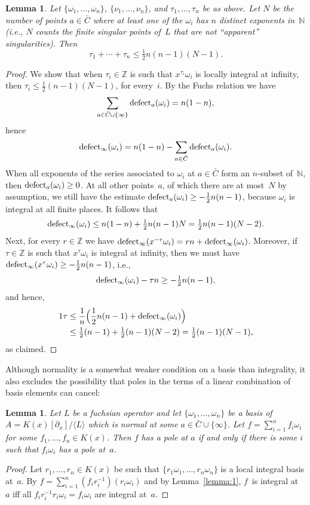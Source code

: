 \documentclass{sig-alternate}
\newtheorem{lemma}[theorem]{Lemma}
\def\<#1>{\langle#1\rangle}
\let\set\mathbb
\begin{document}
\begin{lemma}\label{lemma:bound-exps}
  Let $\{\omega_1,\dots,\omega_n\}$, $\{\nu_1,\dots,\nu_n\}$, and $\tau_1,\dots,\tau_n$ be as above.
  Let $N$ be the number of points $a\in\bar C$ where at least one of the $\omega_i$ has
  $n$ distinct exponents in~$\set N$ (i.e., $N$ counts the
  finite singular points of~$L$ that are not ``apparent'' singularities).
  Then
  \[
    \tau_1+\cdots+\tau_n \leq \tfrac12 n(n-1)(N-1).
  \]
\end{lemma}
\begin{proof}
  We show that when $\tau_i\in\set Z$ is such that $x^{\tau_i}\omega_i$ is locally integral at infinity,
  then $\tau_i\leq \frac12 (n-1)(N-1)$, for every~$i$.
  By the Fuchs relation we have
  \[
    \sum_{a\in\bar C\cup\{\infty\}}\operatorname{defect}_a(\omega_i) = n(1-n),
  \]
  hence
  \[
    \operatorname{defect}_\infty(\omega_i) = n(1-n) - \sum_{a\in\bar C}\operatorname{defect}_a(\omega_i).
  \]
  When all exponents of the series associated to $\omega_i$ at $a\in\bar C$ form an $n$-subset of~$\set N$, then
  $\operatorname{defect}_a(\omega_i)\geq0$. At all other points~$a$, of which there are at most~$N$ by assumption,
  we still have the estimate $\operatorname{defect}_a(\omega_i)\geq-\frac12n(n-1)$, because $\omega_i$ is integral at all finite places.
  It follows that
  \[
    \operatorname{defect}_\infty(\omega_i)\leq n(1-n) + \tfrac12 n(n-1) N = \tfrac12 n(n-1)(N-2).
  \]
  Next, for every $r\in\set Z$ we have $\operatorname{defect}_\infty(x^{-r}\omega_i) = rn+\operatorname{defect}_\infty(\omega_i)$.
  Moreover, if $\tau\in\set Z$ is such that $x^{\tau}\omega_i$ is integral at infinity, then we must have
  $\operatorname{defect}_\infty(x^{\tau}\omega_i)\geq -\frac12n(n-1)$, i.e.,
  \[
    \operatorname{defect}_\infty(\omega_i) - \tau n \geq -\tfrac12n(n-1),
  \]
  and hence,
  \begin{alignat*}1
    \tau &\leq \frac1n\Bigl( \frac12n(n-1) + \defect_\infty(\omega_i) \Bigr) \\
      &\leq \tfrac12 (n-1) + \tfrac12 (n-1)(N-2) = \tfrac12 (n-1)(N-1),
  \end{alignat*}
  as claimed.
\end{proof}

Although normality is a somewhat weaker condition on a basis than integrality,
it also excludes the possibility that poles in the terms of a linear combination
of basis elements can cancel:

\begin{lemma}\label{lemma:3}
  Let $L$ be a fuchsian operator and let $\{\omega_1,\dots,\omega_n\}$ be a basis of $A=K(x)[\partial_x]/\<L>$
  which is normal at some $a\in\bar C\cup\{\infty\}$.
  Let $f=\sum_{i=1}^n f_i\omega_i$ for some $f_1,\dots,f_n\in K(x)$.
  Then $f$ has a pole at $a$ if and only if
  there is some $i$ such that $f_i\omega_i$ has a pole at~$a$.
\end{lemma}
\begin{proof}
  Let $r_1,\dots,r_n\in K(x)$ be such that $\{r_1\omega_1,\dots,r_n\omega_n\}$ is a
  local integral basis at~$a$. By $f=\sum_{i=1}^n
  (f_ir_i^{-1})(r_i\omega_i)$ and by Lemma~\ref{lemma:1}, $f$~is integral at~$a$ iff all
  $f_ir_i^{-1}r_i\omega_i=f_i\omega_i$ are integral at~$a$.
\end{proof}
\end{document}

